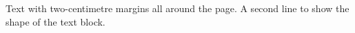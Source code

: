 \documentclass{article}
\begin{document}
Text with two-centimetre margins all around the page.
A second line to show the shape of the text block.
\end{document}
